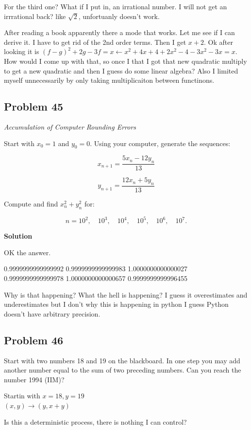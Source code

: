 \documentclass[12pt,tikz,border=10pt]{article}
\theoremstyle{definition}
\theoremstyle{remark}
\begin{document}
For the third one? What if I put in, an irrational number. I will not get an irrrational back? like $\sqrt{2}$, unfortuanly doesn't work.

After reading a book apparently there a mode that works. Let me see if I can derive it.
I have to get rid of the 2nd order terms. Then I get $x+2$. Ok after looking it is $(f-g)^2+2g-3f=x \leftarrow x^2 +4x + 4 + 2x^2 - 4 - 3x^2 - 3x = x$. How would I come up with that, so once I that I got that new quadratic multiply to get a new quadratic and then I guess do some linear algebra? Also I limited myself unnecessarily by only taking multiplicaiton between functinons.

\subsection{Problem 45}


\textit{Accumulation of Computer Rounding Errors}

Start with \( x_0 = 1 \) and \( y_0 = 0 \). Using your computer, generate the sequences:

\[
x_{n+1} = \frac{5x_n - 12y_n}{13}
\]

\[
y_{n+1} = \frac{12x_n + 5y_n}{13}
\]

Compute and find \( x_n^2 + y_n^2 \) for:

\[
n = 10^2, \quad 10^3, \quad 10^4, \quad 10^5, \quad 10^6, \quad 10^7.
\]

\textbf{Solution}

OK the answer. 

0.9999999999999992
0.9999999999999983
1.0000000000000027
0.9999999999999978
1.0000000000000657
0.9999999999996455

Why is that happening? What the hell is happening? I guess it overestimates and 
underestimates but I don't why this is happening in python I guess Python doesn't have arbitrary precision.

\subsection{Problem 46}

Start with two numbers 18 and 19 on the blackboard. In one step you may add another
number equal to the sum of two preceding numbers. Can you reach the number 1994
(IIM)?

Startin with $x=18, y=19$\\
$(x,y) \rightarrow (y,x+y)$

Is this a deterministic process, there is nothing I can control?
\end{document}
